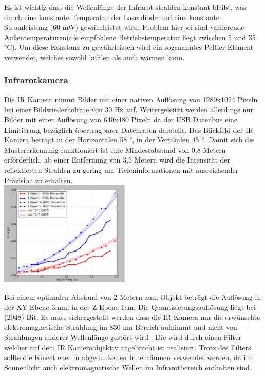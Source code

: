 \documentclass[appendixprefix,a4paper,bibliography=totoc,twoside=true,11pt,DIV=11,BCOR=6mm,headsepline,pointlessnumbers]{scrbook}
\begin{document}
Es ist wichtig dass die Wellenlänge der Infrarot strahlen konstant bleibt, was durch eine konstante Temperatur der Laserdiode und eine konstante Stromleistung (60 mW) gewährleistet wird. Problem hierbei sind variierende Außentemperaturen(die empfohlene Betriebstemperatur  liegt zwischen 5 und 35 °C). Um diese Konstanz zu gewährleisten wird ein sogenanntes  Peltier-Element verwendet, welches sowohl kühlen als auch wärmen kann.\\

\subsubsection{Infrarotkamera}


Die IR Kamera nimmt Bilder mit einer nativen Auflösung von 1280x1024 Pixeln bei einer Bildwiederholrate von 30 Hz auf. Weitergeleitet werden allerdings nur Bilder mit einer Auflösung von 640x480 Pixeln da der USB Datenbus eine Limitierung bezüglich übertragbarer Datenraten darstellt. Das Blickfeld der IR Kamera beträgt in der Horizontalen 58 °, in der Vertikalen 45 °. Damit sich die Mustererkennung funktioniert ist eine Mindestabstand von 0,8 Metern erforderlich, ab einer Entfernung von 3,5 Metern wird die Intensität der reflektierten Strahlen zu gering um Tiefeninformationen mit ausreichender Präzision zu erhalten.\\

\includegraphics[height=5cm]{Res/Res_to_Dist.png}

Bei einem optimalen Abstand von 2 Metern zum Objekt beträgt die Auflösung in der XY Ebene 3mm, in der Z Ebene 1cm.
Die Quantisierungsauflösung liegt bei  (2048) Bit.
Es muss sichergestellt werden dass die IR Kamera nur die erwünschte elektromagnetische Strahlung im 830 nm Bereich aufnimmt und nicht von Strahlungen anderer Wellenlänge gestört wird . Die wird durch einen Filter welcher auf dem IR Kameraobjektiv angebracht ist realisiert.
Trotz des Filters sollte die Kinect eher in abgedunkelten Innenräumen verwendet werden, da im Sonnenlicht auch elektromagnetische Wellen im Infrarotbereich enthalten sind.\\
\end{document}

